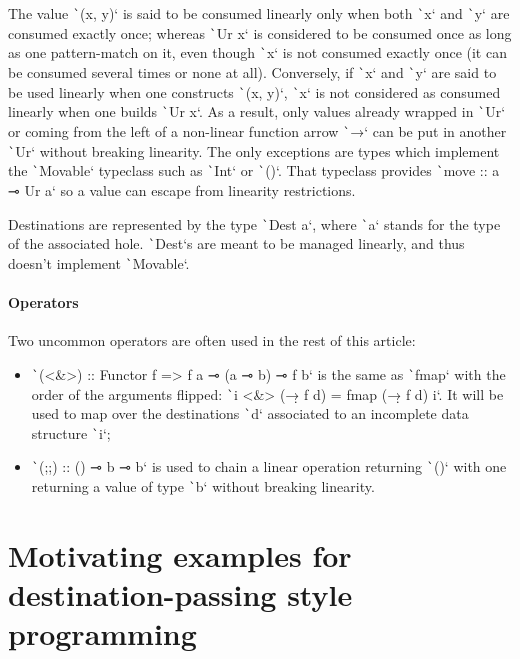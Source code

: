 \documentclass[english]{jflart}
\begin{document}
The value \texttt`(x, y)` is said to be consumed linearly only when both \texttt`x` and \texttt`y` are consumed exactly once; whereas \texttt`Ur x` is considered to be consumed once as long as one pattern-match on it, even though \texttt`x` is not consumed exactly once (it can be consumed several times or none at all). Conversely, if \texttt`x` and \texttt`y` are said to be used linearly when one constructs \texttt`(x, y)`, \texttt`x` is not considered as consumed linearly when one builds \texttt`Ur x`. As a result, only values already wrapped in \texttt`Ur` or coming from the left of a non-linear function arrow \texttt`→` can be put in another \texttt`Ur` without breaking linearity. The only exceptions are types which implement the \texttt`Movable` typeclass such as \texttt`Int` or \texttt`()`. That typeclass provides \texttt`move :: a ⊸ Ur a` so a value can escape from linearity restrictions.

Destinations are represented by the type \texttt`Dest a`, where \texttt`a` stands for the type of the associated hole. \texttt`Dest`s are meant to be managed linearly, and thus doesn't implement \texttt`Movable`.

\paragraph{Operators}

Two uncommon operators are often used in the rest of this article:
\begin{itemize}
  \item \texttt`(<&>) :: Functor f => f a ⊸ (a ⊸ b) ⊸ f b` is the same as \texttt`fmap` with the order of the arguments flipped: \texttt`i <&> (\d → f d) = fmap (\d → f d) i`. It will be used to map over the destinations \texttt`d` associated to an incomplete data structure \texttt`i`;
  \item \texttt`(;;) :: () ⊸ b ⊸ b` is used to chain a linear operation returning \texttt`()` with one returning a value of type \texttt`b` without breaking linearity.
\end{itemize}

\section{Motivating examples for destination-passing style programming}\label{sec:motivating-examples}
\end{document}
